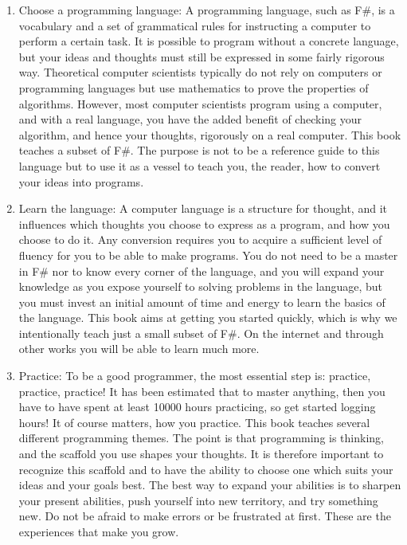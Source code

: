 \documentclass[fsharpNotes.tex]{subfiles}
\begin{document}
\begin{enumerate}
\item Choose a programming language: A programming language, such as F\#, is a vocabulary and a set of grammatical rules for instructing a computer to perform a certain task. It is possible to program without a concrete language, but your ideas and thoughts must still be expressed in some fairly rigorous way. Theoretical computer scientists typically do not rely on computers or programming languages but use mathematics to prove the properties of algorithms. However, most computer scientists program using a computer, and with a real language, you have the added benefit of checking your algorithm, and hence your thoughts, rigorously on a real computer. This book teaches a subset of F\#. The purpose is not to be a reference guide to this language but to use it as a vessel to teach you, the reader, how to convert your ideas into programs.
\item Learn the language: A computer language is a structure for thought, and it influences which thoughts you choose to express as a program, and how you choose to do it. Any conversion requires you to acquire a sufficient level of fluency for you to be able to make programs. You do not need to be a master in F\# nor to know every corner of the language, and you will expand your knowledge as you expose yourself to solving problems in the language, but you must invest an initial amount of time and energy to learn the basics of the language. This book aims at getting you started quickly, which is why we intentionally teach just a small subset of F\#. On the internet and through other works you will be able to learn much more.
\item Practice: To be a good programmer, the most essential step is: practice, practice, practice! It has been estimated that to master anything, then you have to have spent at least 10000 hours practicing, so get started logging hours! It of course matters, how you practice. This book teaches several different programming themes. The point is that programming is thinking, and the scaffold you use shapes your thoughts. It is therefore important to recognize this scaffold and to have the ability to choose one which suits your ideas and your goals best. The best way to expand your abilities is to sharpen your present abilities, push yourself into new territory, and try something new. Do not be afraid to make errors or be frustrated at first. These are the experiences that make you grow.

\end{enumerate}
\end{document}
